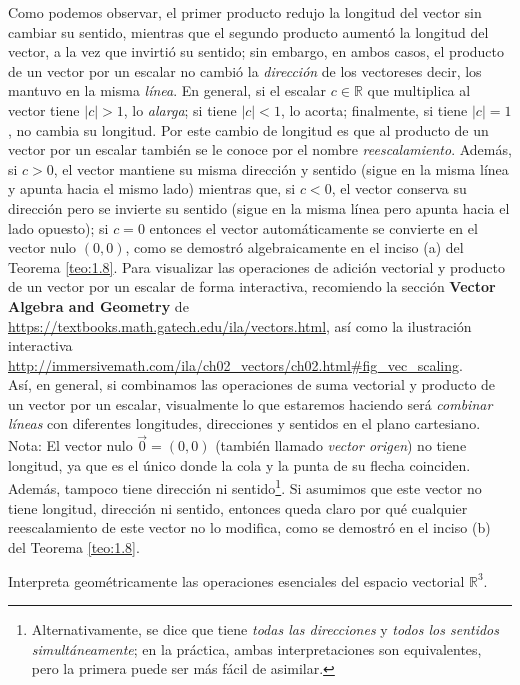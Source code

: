 \documentclass[notasLineal]{subfiles}
\begin{document}
Como podemos observar, el primer producto redujo la longitud del vector sin cambiar su sentido, mientras que el segundo producto aumentó la longitud del vector, a la vez que invirtió su sentido; sin embargo, en ambos casos, el producto de un vector por un escalar no cambió la \emph{dirección} de los vectores\textemdash es decir, los mantuvo en la misma \emph{línea}. En general, si el escalar $c\in\mathbb{R}$ que multiplica al vector tiene $|c|>1$, lo \emph{alarga}; si tiene $|c|<1$, lo acorta; finalmente, si tiene $|c|=1$, no cambia su longitud. Por este cambio de longitud es que al producto de un vector por un escalar también se le conoce por el nombre \emph{reescalamiento}. Además, si $c>0$, el vector mantiene su misma dirección y sentido (sigue en la misma línea y apunta hacia el mismo lado) mientras que, si $c<0$, el vector conserva su dirección pero se invierte su sentido (sigue en la misma línea pero apunta hacia el lado opuesto); si $c=0$ entonces el vector automáticamente se convierte en el vector nulo $(0,0)$, como se demostró algebraicamente en el inciso (a) del Teorema \ref{teo:1.8}. Para visualizar las operaciones de adición vectorial y producto de un vector por un escalar de forma interactiva, recomiendo la sección \textbf{Vector Algebra and Geometry} de \url{https://textbooks.math.gatech.edu/ila/vectors.html}, así como la ilustración interactiva \url{http://immersivemath.com/ila/ch02_vectors/ch02.html#fig_vec_scaling}. \\

    Así, en general, si combinamos las operaciones de suma vectorial y producto de un vector por un escalar, visualmente lo que estaremos haciendo será \emph{combinar líneas} con diferentes longitudes, direcciones y sentidos en el plano cartesiano. \\

Nota: El vector nulo $\vec{0}=(0,0)$ (también llamado \emph{vector origen}) no tiene longitud, ya que es el único donde la cola y la punta de su flecha coinciden. Además, tampoco tiene dirección ni sentido\footnote{Alternativamente, se dice que tiene \emph{todas las direcciones} y \emph{todos los sentidos simultáneamente}; en la práctica, ambas interpretaciones son equivalentes, pero la primera puede ser más fácil de asimilar.}. Si asumimos que este vector no tiene longitud, dirección ni sentido, entonces queda claro por qué cualquier reescalamiento de este vector no lo modifica, como se demostró en el inciso (b) del Teorema \ref{teo:1.8}.

\begin{Ejer}
    Interpreta geométricamente las operaciones esenciales del espacio vectorial $\mathbb{R}^3$.
\end{Ejer}
\end{document}
